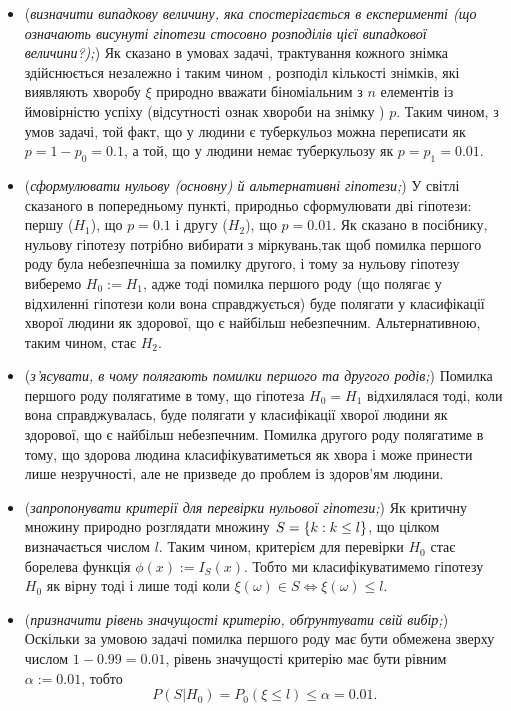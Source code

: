 \documentclass[12pt]{article} %
\begin{document}
	\begin{itemize}
		\item (\textit{визначити випадкову величину, яка спостерігається в експерименті (що означають висунуті гіпотези стосовно
			розподілів цієї випадкової величини?);})
			Як сказано в умовах задачі, трактування кожного знімка здійснюється незалежно і таким чином
			, розподіл кількості знімків, які виявляють хворобу $\xi$ природно вважати біноміальним з $n$ елементів
			із ймовірністю успіху (відсутності ознак хвороби на знімку
			) $p$. Таким чином, з умов задачі, той факт, що у людини є туберкульоз можна переписати як $p=1-p_0=0.1$, а той,
			що у людини немає туберкульозу як $p=p_1=0.01$. 
		\item (\textit{сформулювати нульову (основну) й альтернативні гіпотези;}) У світлі сказаного в попередньому пункті, природньо
			сформулювати дві гіпотези: першу ($H_1$), що $p=0.1$ і другу ($H_2$), що $p=0.01$.
			Як сказано в посібнику, нульову гіпотезу потрібно вибирати з міркувань,так щоб помилка першого роду була небезпечніша
			за помилку другого, і тому за нульову гіпотезу виберемо $H_0:=H_1$, адже тоді помилка першого роду (що полягає у відхиленні
			гіпотези коли вона справджується) буде полягати у класифікації хворої людини як здорової, що є найбільш небезпечним.
			Альтернативною, таким чином, стає $H_2$.
		\item (\textit{з’ясувати, в чому полягають помилки першого та другого родів;})
			Помилка першого роду полягатиме в тому, що гіпотеза $H_0=H_1$ відхилялася тоді, коли вона справджувалась, 
			буде полягати у класифікації хворої людини як здорової, що є найбільш небезпечним.
			Помилка другого роду полягатиме в тому, що здорова людина класифікуватиметься як хвора і може принести лише незручності,
			але не призведе до проблем із здоров’ям людини.
		\item (\textit{запропонувати критерії для перевірки нульової гіпотези;})
			Як критичну множину природно розглядати множину $S=\left\{k:k\leq l\right\}$, що цілком визначається числом $l$. Таким
			чином, критерієм для перевірки $H_0$ стає борелева функція $\phi(x):=I_S(x)$. Тобто ми класифікуватимемо гіпотезу
			$H_0$ як вірну тоді і лише тоді коли $\xi(\omega)\in S\iff\xi(\omega)\leq l$.
		\item (\textit{призначити рівень значущості критерію, обґрунтувати свій вибір;})
			Оскільки за умовою задачі помилка першого роду має бути обмежена зверху числом $1-0.99=0.01$, рівень значущості
			критерію має бути рівним $\alpha:=0.01$, тобто
			\[P(S\big| H_0)=P_0(\xi\leq l)\leq\alpha=0.01.\]

\end{itemize}
\end{document}
